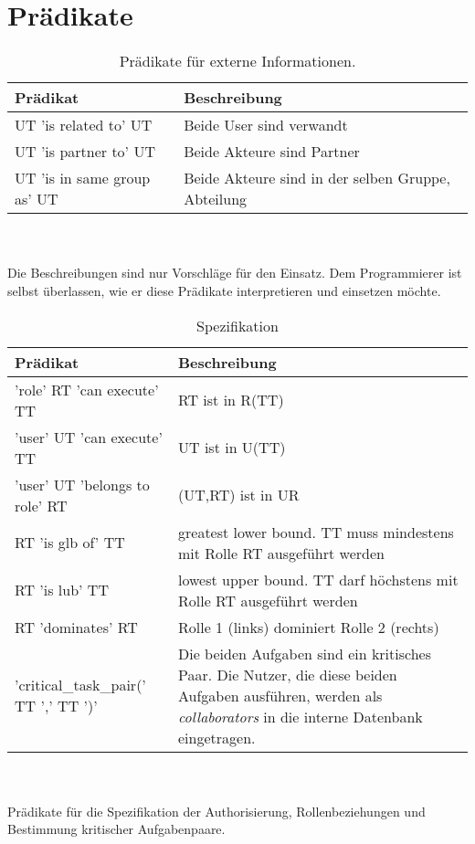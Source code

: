 
\chapter{Prädikate} %

\label{AppendixA} %


\begin{table}[h]
\begin{tabular} {|p{6cm}|p{10cm}|}
\hline
\textbf{Prädikat} & \textbf{Beschreibung}\\
\hline
UT 'is related to' UT 		& Beide User sind verwandt \\
\hline
UT 'is partner to' UT		& Beide Akteure sind Partner \\
\hline
UT 'is in same group as' UT	& Beide Akteure sind in der selben Gruppe, Abteilung\\
\hline
\end{tabular}
\\\\\small Die Beschreibungen sind nur Vorschläge für den Einsatz. Dem Programmierer ist selbst überlassen, wie er diese Prädikate interpretieren und einsetzen möchte.
\caption{Prädikate für externe Informationen.}
\label{tab:extern}
\end{table}

\begin{table}[h]
\begin{tabular} {|p{6cm}|p{10cm}|}
\hline
\textbf{Prädikat} & \textbf{Beschreibung}\\
\hline
'role' RT 'can execute' TT	& RT ist in  R(TT)\\
\hline
'user' UT 'can execute' TT 	& UT ist in U(TT)\\
\hline
'user' UT 'belongs to role' RT  & (UT,RT) ist in UR\\
\hline
RT 'is glb of' TT 		& greatest lower bound. TT muss mindestens mit Rolle RT ausgeführt werden\tnote{1}\\
\hline
RT 'is lub' TT 			& lowest upper bound. TT darf höchstens mit Rolle RT ausgeführt werden\tnote{1}\\
\hline
RT 'dominates' RT 		& Rolle 1 (links) dominiert Rolle 2 (rechts)\\
\hline
'critical{\_}task{\_}pair(' TT ',' TT ')'& Die beiden Aufgaben sind ein kritisches Paar. Die Nutzer, die diese beiden Aufgaben ausführen, werden als \textit{collaborators} in die interne Datenbank eingetragen.\\
\hline
\end{tabular}
\\\\\small Prädikate für die Spezifikation der Authorisierung, Rollenbeziehungen und Bestimmung kritischer Aufgabenpaare.
\caption{Spezifikation}
\label{tab:specification}
\end{table}

